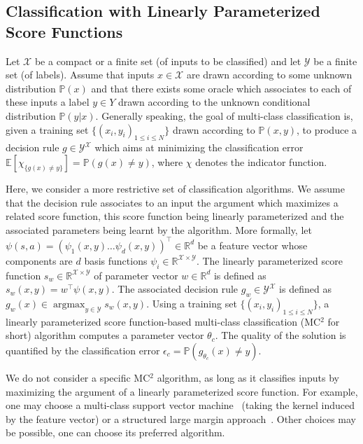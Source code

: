 \documentclass[english,utf8]{./hermes-journal}
\newcommand{\argmax}{\operatorname*{argmax}} %
\newcommand{\X}{\mathcal{X}}
\newcommand{\Y}{\mathcal{Y}}
\newcommand{\E}{\mathbb{E}}
\newcommand{\prob}{\mathbb{P}}
\begin{document}
\subsection{Classification with Linearly Parameterized Score
Functions} \label{subsec:background:classif}

Let $\X$ be a compact or a finite set (of inputs to be classified)
and let $\Y$ be a finite set (of labels). Assume that inputs $x\in
\X$  are drawn according to some unknown distribution $\prob(x)$ and
that there exists some oracle which associates to each of these
inputs a label $y\in Y$ drawn according to the unknown conditional
distribution $\prob(y|x)$. Generally speaking, the goal of
multi-class classification is, given a training set
$\{(x_i,y_i)_{1\leq i \leq N}\}$ drawn according to $\prob(x,y)$, to
produce a decision rule $g\in\Y^\X$ which aims at minimizing the
classification error $\E[\chi_{\{g(x)\neq y\}}] = \prob(g(x)\neq
y)$, where $\chi$ denotes the indicator function.

Here, we consider a more restrictive set of classification
algorithms. We assume that the decision rule associates to an input
the argument which maximizes a related score function, this score
function being linearly parameterized and the associated parameters
being learnt by the algorithm. More formally, let $\psi(s,a) =
(\psi_1(x,y)  \dots  \psi_d(x,y))^\top\in \mathbb{R}^d$
be a feature vector whose components are $d$ basis functions
$\psi_i\in\mathbb{R}^{\X\times\Y}$. The linearly parameterized score
function $s_w\in\mathbb{R}^{\X\times \Y}$ of parameter vector
$w\in\mathbb{R}^d$ is defined as $s_w(x,y) = w^\top \psi(x,y)$. The
associated decision rule $g_w\in{\Y^\X}$ is defined as $g_w(x) \in
\argmax_{y\in\Y}s_w(x,y)$. Using a training set $\{(x_i,y_i)_{1\leq
i\leq N}\}$, a linearly parameterized score function-based
multi-class classification (MC$^2$ for short) algorithm computes a
parameter vector $\theta_c$. The quality of the solution is
quantified by the classification error $\epsilon_c =
\prob(g_{\theta_c}(x)\neq y)$.

We do not consider a specific MC$^2$ algorithm, as long as it
classifies inputs by maximizing the argument of a linearly
parameterized score function. For example, one may choose a
multi-class support vector machine~\cite{Guermeur:2007} (taking the
kernel induced by the feature vector) or a structured large margin
approach~\cite{Taskar:2005}. Other choices may be possible, one can
choose its preferred algorithm.
\end{document}
